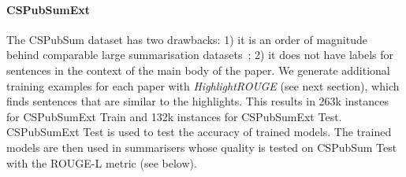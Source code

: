 \documentclass[11pt,a4paper]{article}
\begin{document}

\paragraph{CSPubSumExt} The CSPubSum dataset has two drawbacks: 1) it is an order of magnitude behind comparable large summarisation datasets~\cite{hermann2015teaching,nallapati2016abstractive}; 2) it does not have labels for sentences in the context of the main body of the paper. We generate additional training examples for each paper with \textit{HighlightROUGE} (see next section), which finds sentences that are similar to the highlights. This results in 263k instances for CSPubSumExt Train and 132k instances for CSPubSumExt Test. CSPubSumExt Test is used to test the accuracy of trained models. The trained models are then used in summarisers whose quality is tested on CSPubSum Test with the ROUGE-L metric (see below).


\end{document}

